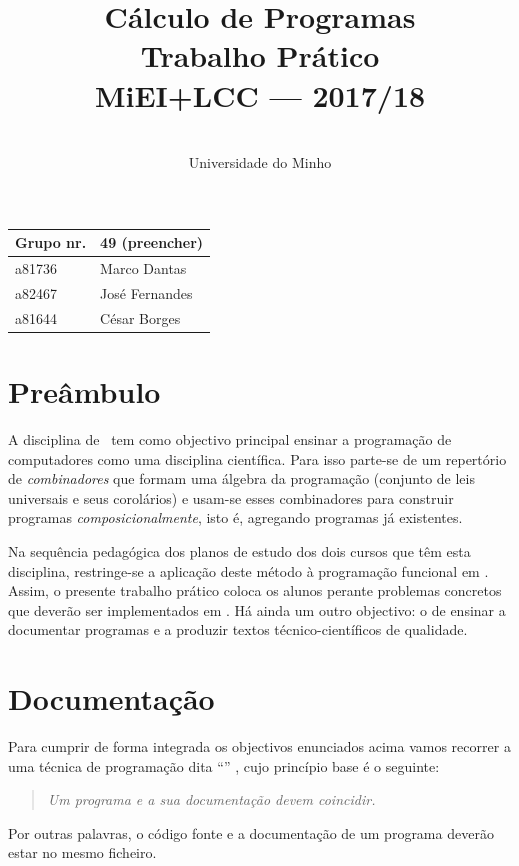 \documentclass[a4paper]{article}
\title{
            Cálculo de Programas
\\
        Trabalho Prático
\\
        MiEI+LCC --- 2017/18
}
\author{
        \dium
\\
        Universidade do Minho
}
\date\mydate
\begin{document}
\maketitle

\begin{center}\large
\begin{tabular}{ll}
\textbf{Grupo} nr. & 49 (preencher)
\\\hline
a81736 & Marco Dantas
\\
a82467 & José Fernandes
\\
a81644 & César Borges
\end{tabular}
\end{center}

\section{Preâmbulo}

A disciplina de \CP\ tem como objectivo principal ensinar
a progra\-mação de computadores como uma disciplina científica. Para isso
parte-se de um repertório de \emph{combinadores} que formam uma álgebra da
programação (conjunto de leis universais e seus corolários) e usam-se esses
combinadores para construir programas \emph{composicionalmente}, isto é,
agregando programas já existentes.

Na sequência pedagógica dos planos de estudo dos dois cursos que têm esta
disciplina, restringe-se a aplicação deste método à programação funcional
em \Haskell. Assim,
o presente trabalho prático coloca os alunos perante problemas
concretos que deverão ser implementados em \Haskell.
Há ainda um outro objectivo: o de ensinar a documentar programas e
a produzir textos técnico-científicos de qualidade.

\section{Documentação}
Para cumprir de forma integrada os objectivos enunciados acima vamos recorrer
a uma técnica de programa\-ção dita ``'' \cite{Kn92}, cujo
princípio base é o seguinte:
\begin{quote}\em
Um programa e a sua documentação devem coincidir.
\end{quote}
Por outras palavras, o código fonte e a documentação de um programa deverão estar no
mesmo ficheiro.
\end{document}
